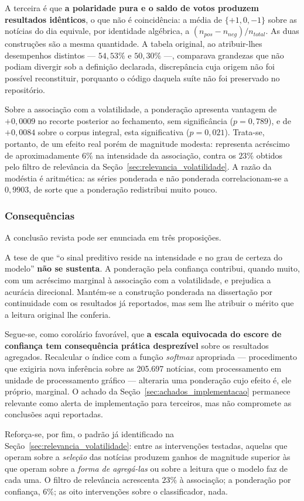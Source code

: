 A terceira é que \textbf{a polaridade pura e o saldo de votos produzem resultados idênticos}, o que
não é coincidência: a média de $\{+1, 0, -1\}$ sobre as notícias do dia equivale, por identidade
algébrica, a $(n_{pos} - n_{neg})/n_{total}$. As duas construções são a mesma quantidade. A tabela
original, ao atribuir-lhes desempenhos distintos --- $54{,}53\%$ e $50{,}30\%$ ---, comparava
grandezas que não podiam divergir sob a definição declarada, discrepância cuja origem não foi
possível reconstituir, porquanto o código daquela suíte não foi preservado no repositório.

Sobre a associação com a volatilidade, a ponderação apresenta vantagem de $+0{,}0009$ no recorte
posterior ao fechamento, sem significância ($p = 0{,}789$), e de $+0{,}0084$ sobre o corpus integral,
esta significativa ($p = 0{,}021$). Trata-se, portanto, de um efeito real porém de magnitude
modesta: representa acréscimo de aproximadamente $6\%$ na intensidade da associação, contra os
$23\%$ obtidos pelo filtro de relevância da Seção~\ref{sec:relevancia_volatilidade}. A razão da
modéstia é aritmética: as séries ponderada e não ponderada correlacionam-se a $0{,}9903$, de sorte
que a ponderação redistribui muito pouco.

\subsubsection{Consequências}

A conclusão revista pode ser enunciada em três proposições.

A tese de que ``o sinal preditivo reside na intensidade e no grau de certeza do modelo''
\textbf{não se sustenta}. A ponderação pela confiança contribui, quando muito, com um acréscimo
marginal à associação com a volatilidade, e prejudica a acurácia direcional. Mantém-se a construção
ponderada na dissertação por continuidade com os resultados já reportados, mas sem lhe atribuir o
mérito que a leitura original lhe conferia.

Segue-se, como corolário favorável, que \textbf{a escala equivocada do escore de confiança tem
consequência prática desprezível} sobre os resultados agregados. Recalcular o índice com a função
\textit{softmax} apropriada --- procedimento que exigiria nova inferência sobre as 205.697 notícias,
com processamento em unidade de processamento gráfico --- alteraria uma ponderação cujo efeito é, ele
próprio, marginal. O achado da Seção~\ref{sec:achados_implementacao} permanece relevante como
alerta de implementação para terceiros, mas não compromete as conclusões aqui reportadas.

Reforça-se, por fim, o padrão já identificado na Seção~\ref{sec:relevancia_volatilidade}: entre as
intervenções testadas, aquelas que operam sobre a \emph{seleção} das notícias produzem ganhos de
magnitude superior às que operam sobre a \emph{forma de agregá-las} ou sobre a leitura que o modelo
faz de cada uma. O filtro de relevância acrescenta $23\%$ à associação; a ponderação por confiança,
$6\%$; as oito intervenções sobre o classificador, nada.
